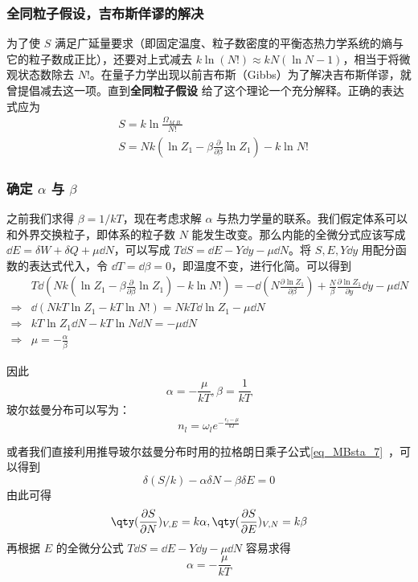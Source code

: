 \subsubsection{全同粒子假设，吉布斯佯谬的解决}
为了使 $S$ 满足广延量要求（即固定温度、粒子数密度的平衡态热力学系统的熵与它的粒子数成正比），还要对上式减去 $k\ln (N!)\approx k N(\ln N-1)$，相当于将微观状态数除去 $N!$。在量子力学出现以前吉布斯（Gibbs）为了解决吉布斯佯谬，就曾提倡减去这一项。直到\textbf{全同粒子假设} 给了这个理论一个充分解释。正确的表达式应为
\begin{equation}\label{eq_TheSta_5}
\begin{aligned}
&S=k\ln \frac{\Omega_{M.B.}}{N!}\\
&S=Nk(\ln Z_1-\beta\frac{\partial }{\partial \beta}\ln Z_1)-k\ln N!
\end{aligned}
\end{equation}
\subsubsection{确定 $\alpha$ 与 $\beta$}
之前我们求得 $\beta=1/kT$，现在考虑求解 $\alpha$ 与热力学量的联系。我们假定体系可以和外界交换粒子，即体系的粒子数 $N$ 能发生改变。那么内能的全微分式应该写成 $\dd E=\delta W+\delta Q+\mu\dd N$，可以写成 $T\dd S=\dd E-Y\dd y-\mu\dd N$。将 $S,E,Y\dd y$ 用配分函数的表达式代入，令 $\dd T=\dd \beta=0$，即温度不变，进行化简。可以得到
\begin{equation}
\begin{aligned}
&T\dd(Nk(\ln Z_1-\beta\frac{\partial }{\partial \beta}\ln Z_1)-k\ln N!)=-\dd(N \frac{\partial \ln Z_1}{\partial \beta})+\frac{N}{\beta}\frac{\partial \ln Z_1}{\partial y}\dd y-\mu\dd N\\
\Rightarrow &\dd(NkT\ln Z_1-kT\ln N!)=NkT \dd \ln Z_1 -\mu \dd N\\
\Rightarrow & kT\ln Z_1 \dd N-kT\ln N\dd N=-\mu\dd N\\
\Rightarrow &\mu=-\frac{\alpha}{\beta}
\end{aligned}
\end{equation}

因此
\begin{equation}
\alpha=-\frac{\mu}{kT},\beta=\frac{1}{kT}
\end{equation}
玻尔兹曼分布可以写为：
\begin{equation}
n_l=\omega_l e^{-\frac{\epsilon_l-\mu}{kT}}
\end{equation}

或者我们直接利用推导玻尔兹曼分布时用的拉格朗日乘子公式\autoref{eq_MBsta_7}~，可以得到
\begin{equation}
\delta(S/k)-\alpha \delta N-\beta \delta E=0
\end{equation}
由此可得
\begin{equation}
\qty(\frac{\partial S}{\partial N})_{V,E}=k\alpha,\qty(\frac{\partial S}{\partial E})_{V,N}=k\beta
\end{equation}
再根据 $E$ 的全微分公式 $T\dd S=\dd E-Y\dd y-\mu\dd N$ 容易求得
\begin{equation}
\alpha=-\frac{\mu}{kT}
\end{equation}

